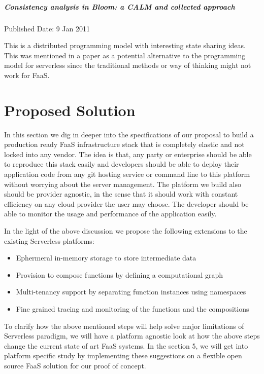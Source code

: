 \documentclass[12pt,titlepage]{article}
\begin{document}
\subparagraph{Consistency analysis in Bloom: a CALM and collected approach}
\label{sec:org79fd72e}

Published Date: 9 Jan 2011

This is a distributed programming model with interesting state sharing ideas. This was mentioned in a paper as a potential alternative to the programming model for serverless since the traditional methods or way of thinking might not work for FaaS.

\section{Proposed Solution}
\label{sec:orgcab881b}

In this section we dig in deeper into the specifications of our proposal to
build a production ready FaaS infrastructure stack that is completely elastic
and not locked into any vendor. The idea is that, any party or enterprise should
be able to reproduce this stack easily and developers should be able to deploy their
application code from any git hosting service or command line to this platform
without worrying about the server management. The platform we build also should
be provider agnostic, in the sense that it should work with constant efficiency
on any cloud provider the user may choose. The developer should be able to
monitor the usage and performance of the application easily.

In the light of the above discussion we propose the following extensions to the
existing Serverless platforms:
\begin{itemize}
\item Ephermeral in-memory storage to store intermediate data
\item Provision to compose functions by defining a computational graph
\item Multi-tenancy support by separating function instances using namespaces
\item Fine grained tracing and monitoring of the functions and the compositions
\end{itemize}

To clarify how the above mentioned steps will help solve major limitations of
Serverless paradigm, we will have a platform agnostic look at how the above
steps change the current state of art FaaS systems. In the section 5, we will
get into platform specific study by implementing these suggestions on a flexible
open source FaaS solution for our proof of concept.
\end{document}
